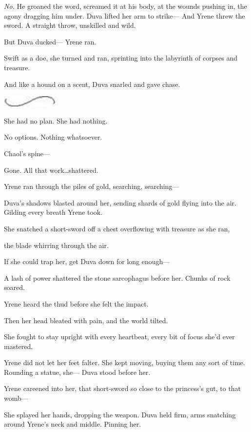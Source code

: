 \emph{No.} He groaned the word, screamed it at his body, at the wounds pushing in, the agony dragging him under.
Duva lifted her arm to strike--- And Yrene threw the sword.
A straight throw, unskilled and wild.

But Duva ducked--- Yrene ran.

Swift as a doe, she turned and ran, sprinting into the labyrinth of corpses and treasure.

And like a hound on a scent, Duva snarled and gave chase.

\begin{center}
	\includegraphics[width=1.12in,height=0.24in]{images/seperator}
\end{center}

She had no plan.
She had nothing.

No options.
Nothing whatsoever.

Chaol's spine---

Gone.
All that work\ldots shattered.

Yrene ran through the piles of gold, searching, searching---

Duva's shadows blasted around her, sending shards of gold flying into the air.
Gilding every breath Yrene took.

She snatched a short-sword off a chest overflowing with treasure as she ran,

the blade whirring through the air.

If she could trap her, get Duva down for long enough---

A lash of power shattered the stone sarcophagus before her.
Chunks of rock soared.

Yrene heard the thud before she felt the impact.

Then her head bleated with pain, and the world tilted.

She fought to stay upright with every heartbeat, every bit of focus she'd ever mastered.

Yrene did not let her feet falter.
She kept moving, buying them any sort of time.
Rounding a statue, she--- Duva stood before her.

Yrene careened into her, that short-sword so close to the princess's gut, to that womb---

She splayed her hands, dropping the weapon.
Duva held firm, arms snatching around Yrene's neck and middle.
Pinning her.

